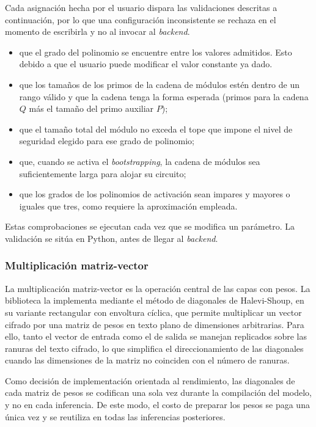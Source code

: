 Cada asignación hecha por el usuario dispara las validaciones descritas a continuación, por lo que una configuración inconsistente se rechaza en el momento de escribirla y no al invocar al \textit{backend}.

\begin{itemize}
    \item que el grado del polinomio se encuentre entre los valores admitidos. Esto debido a que el usuario puede modificar el valor constante ya dado. 
    \item que los tamaños de los primos de la cadena de módulos estén dentro de un rango válido y que la cadena tenga la forma esperada (primos para la cadena $Q$ más el tamaño del primo auxiliar $P$);
    \item que el tamaño total del módulo no exceda el tope que impone el nivel de seguridad elegido para ese grado de polinomio;
    \item que, cuando se activa el \textit{bootstrapping}, la cadena de módulos sea suficientemente larga para alojar su circuito;
    \item que los grados de los polinomios de activación sean impares y mayores o iguales que tres, como requiere la aproximación empleada.
\end{itemize}

Estas comprobaciones se ejecutan cada vez que se modifica un parámetro. La validación se sitúa en Python, antes de llegar al \textit{backend}.

\subsubsection{Multiplicación matriz-vector}

La multiplicación matriz-vector es la operación central de las capas con pesos. La biblioteca la implementa mediante el método de diagonales de Halevi-Shoup, en su variante rectangular con envoltura cíclica, que permite multiplicar un vector cifrado por una matriz de pesos en texto plano de dimensiones arbitrarias. Para ello, tanto el vector de entrada como el de salida se manejan replicados sobre las ranuras del texto cifrado, lo que simplifica el direccionamiento de las diagonales cuando las dimensiones de la matriz no coinciden con el número de ranuras.

Como decisión de implementación orientada al rendimiento, las diagonales de cada matriz de pesos se codifican una sola vez durante la compilación del modelo, y no en cada inferencia. De este modo, el costo de preparar los pesos se paga una única vez y se reutiliza en todas las inferencias posteriores.

